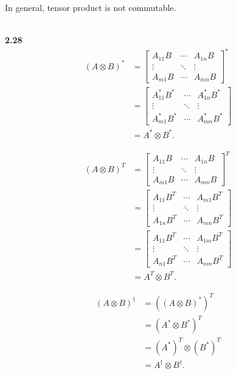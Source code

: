 \documentclass[10pt]{book}
\newcommand{\Textbf}[1]{\hspace{3mm}\\ \textbf{#1}\\}
\begin{document}
	In general, tensor product is not commutable.
	
	
	
	\Textbf{2.28}
	\begin{equation}
\begin{aligned}
		(A \otimes B)^*
		&=
		\begin{bmatrix}
			A_{11} B & \cdots & A_{1n} B \\
			\vdots & \ddots  & \vdots \\
			A_{m1}B & \cdots & A_{mn} B
		\end{bmatrix}^* \\
		&=
		\begin{bmatrix}
			A_{11}^* B^* & \cdots & A_{1n}^* B^* \\
			\vdots & \ddots  & \vdots \\
			A_{m1}^* B^* & \cdots & A_{mn}^* B^*
		\end{bmatrix} \\
		&= A^* \otimes B^*.
	\end{aligned}
\end{equation}
	
	
	\begin{equation}
\begin{aligned}
		(A\otimes B)^T &=
		\begin{bmatrix}
			A_{11} B & \cdots & A_{1n} B \\
			\vdots & \ddots  & \vdots \\
			A_{m1}B & \cdots & A_{mn} B
		\end{bmatrix}^T \\
		&=
		\begin{bmatrix}
			A_{11} B^T & \cdots & A_{m1} B^T \\
			\vdots & \ddots  & \vdots \\
			A_{1n} B^T & \cdots & A_{mn} B^T
		\end{bmatrix} \\
		&=
		\begin{bmatrix}
			A_{11} B^T & \cdots & A_{1m} B^T \\
			\vdots & \ddots  & \vdots \\
			A_{n1} B^T & \cdots & A_{nm} B^T
		\end{bmatrix} \\
		&= A^T \otimes B^T.
	\end{aligned}
\end{equation}
	
	
	\begin{equation}
\begin{aligned}
		(A\otimes B)^\dagger&=((A \otimes B)^*)^T	\\
		&= (A^* \otimes B^*)^T\\
		&= (A^*)^T \otimes (B^*)^T\\
		&= A^\dagger \otimes B^\dagger.
	\end{aligned}
\end{equation}
	
\end{document}
